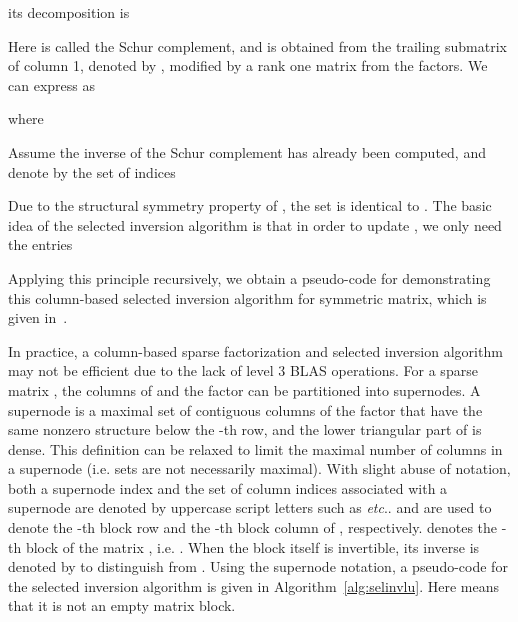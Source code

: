 \documentclass[10pt, conference, compsocconf,letterpaper,twocolumn]{IEEEtran}
\newcommand{\etc}{\textit{etc}.\xspace}
\begin{document}
its  decomposition is 

Here  is called the Schur complement, and is obtained from the
trailing submatrix of column 1, denoted by , modified by a rank one
matrix from the  factors.
We can express  as

where


Assume the inverse of the Schur complement  has already been computed, and denote by  the set of indices
  
Due to the structural symmetry property of ,  the set
 is identical to .
The basic idea of the selected inversion algorithm is that in order to
update , we only need
the entries 
 
Applying this principle recursively, we obtain a pseudo-code for
demonstrating this column-based selected inversion algorithm for symmetric matrix,
which is given in~\cite{LinYangMezaEtAl2011}.

In practice, a column-based sparse factorization and selected inversion
algorithm may not be efficient due to the lack of level 3 BLAS
operations.  For a sparse matrix , the columns of  and the 
factor can be partitioned into supernodes. A supernode is a maximal set
of contiguous columns  of the  factor that
have the same nonzero structure below the -th row, and the lower
triangular part of  is dense. This definition can be
relaxed to limit the maximal number of columns in a supernode (i.e. sets
are not necessarily maximal).  With slight abuse of notation, both a
supernode index and the set of column indices associated with a
supernode are denoted by uppercase script letters such as 
\etc.   and  are used to denote the -th block
row and the -th block column of , respectively.
 denotes the -th block of the matrix
, i.e. .  When the
block  itself is invertible, its inverse is denoted by
 to distinguish from .
Using the supernode notation, a pseudo-code for the selected inversion
algorithm is given in Algorithm~\ref{alg:selinvlu}.   Here  means that it is not an empty matrix block.
\end{document}
